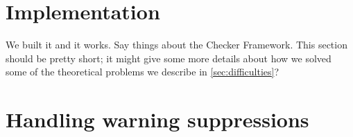 \section{Implementation}
\label{sec:implementation}

We built it and it works. Say things about the Checker Framework. This section
should be pretty short; it might give some more details about how we solved
some of the theoretical problems we describe in \cref{sec:difficulties}?



\section{Handling warning suppressions}

